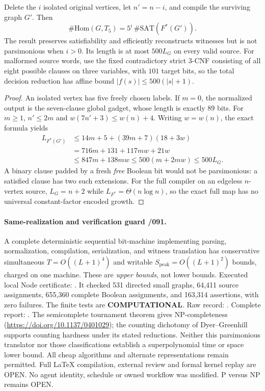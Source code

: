 \documentclass[11pt]{article}
\begin{document}
\begin{corollary}
Delete the $i$ isolated original vertices, let $n'=n-i$, and
compile the surviving graph $G'$. Then
\[
 \#\mathrm{Hom}(G,T_5)=5^i\,\#\mathrm{SAT}(F^*(G')).
\]
The result preserves satisfiability and efficiently reconstructs
witnesses but is not parsimonious when $i>0$. Its length is
at most $500L_G$ on every valid source.
For malformed source words, use the fixed contradictory strict
$3$-CNF consisting of all eight possible clauses on three variables,
with $101$ target bits, so the total decision reduction
has affine bound $\lvert f(s)\rvert\le500(\lvert s\rvert+1)$.
\end{corollary}
\begin{proof}
An isolated vertex has five freely chosen labels. If $m=0$, the
normalized output is the seven-clause global gadget, whose length
is exactly $89$ bits. For $m\ge1$, $n'\le2m$ and
$w(7n'+3)\le w(n)+4$. Writing $w=w(n)$, the exact formula yields
\[
\begin{split}
L_{F^*(G')}&\le 14m+5+(39m+7)(18+3w)\\
 &=716m+131+117mw+21w\\
 &\le847m+138mw\le500(m+2mw)\le500L_G.
\end{split}
\]
A binary clause padded by a fresh \emph{free} Boolean bit would not
be parsimonious: a satisfied clause has two such extensions.
For the full compiler on an edgeless $n$-vertex source,
$L_G=n+2$ while $L_{F^*}=\Theta(n\log n)$, so the exact full map
has no universal constant-factor encoded growth.
\end{proof}

\paragraph{Same-realization and verification guard /091.}
A complete deterministic sequential bit-machine implementing parsing,
normalization, compilation, serialization, and witness translation
has conservative simultaneous $T=O((L+1)^4)$ and writable
$S_{\mathrm{peak}}=O((L+1)^2)$ bounds, charged on one machine.
These are \emph{upper bounds}, not lower bounds.
Executed local Node certificate:
.
It checked 531 directed small graphs, 64,411 source assignments,
655,360 complete Boolean assignments, and 163,314 assertions,
with zero failures. The finite tests are \textbf{COMPUTATIONAL}.
Raw record:
.
Complete report:
.
The semicomplete tournament theorem gives NP-completeness
(\url{https://doi.org/10.1137/0401029}); the counting dichotomy of
Dyer--Greenhill supports counting hardness under its stated reductions.
Neither this parsimonious translator nor those classifications
establish a superpolynomial time or space lower bound. All cheap
algorithms and alternate representations remain permitted.
Full LaTeX compilation, external review and formal kernel replay
are OPEN. No agent identity, schedule or owned workflow was modified.
P versus NP remains OPEN.
\end{document}
